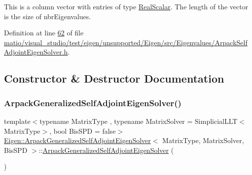 This is a column vector with entries of type \hyperlink{class_eigen_1_1_arpack_generalized_self_adjoint_eigen_solver_a2555af55e53bf9de894a49e639be2e1e}{Real\+Scalar}. The length of the vector is the size of {\ttfamily nbr\+Eigenvalues}. 

Definition at line \hyperlink{matio_2visual__studio_2test_2eigen_2unsupported_2_eigen_2src_2_eigenvalues_2_arpack_self_adjoint_eigen_solver_8h_source_l00062}{62} of file \hyperlink{matio_2visual__studio_2test_2eigen_2unsupported_2_eigen_2src_2_eigenvalues_2_arpack_self_adjoint_eigen_solver_8h_source}{matio/visual\+\_\+studio/test/eigen/unsupported/\+Eigen/src/\+Eigenvalues/\+Arpack\+Self\+Adjoint\+Eigen\+Solver.\+h}.



\subsection{Constructor \& Destructor Documentation}
\mbox{\label{class_eigen_1_1_arpack_generalized_self_adjoint_eigen_solver_aab45c05af4937baddb38e26bffe80a42}} 
\subsubsection{\texorpdfstring{Arpack\+Generalized\+Self\+Adjoint\+Eigen\+Solver()}{ArpackGeneralizedSelfAdjointEigenSolver()}\hspace{0.1cm}{\footnotesize\ttfamily [1/6]}}
{\footnotesize\ttfamily template$<$typename Matrix\+Type , typename Matrix\+Solver  = Simplicial\+L\+L\+T$<$\+Matrix\+Type$>$, bool Bis\+S\+PD = false$>$ \\
\hyperlink{class_eigen_1_1_arpack_generalized_self_adjoint_eigen_solver}{Eigen\+::\+Arpack\+Generalized\+Self\+Adjoint\+Eigen\+Solver}$<$ Matrix\+Type, Matrix\+Solver, Bis\+S\+PD $>$\+::\hyperlink{class_eigen_1_1_arpack_generalized_self_adjoint_eigen_solver}{Arpack\+Generalized\+Self\+Adjoint\+Eigen\+Solver} (\begin{DoxyParamCaption}{ }\end{DoxyParamCaption})\hspace{0.3cm}{\ttfamily [inline]}}



